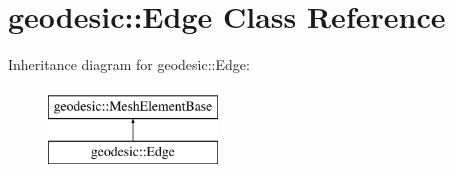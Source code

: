 \hypertarget{classgeodesic_1_1_edge}{}\section{geodesic\+:\+:Edge Class Reference}
\label{classgeodesic_1_1_edge}
Inheritance diagram for geodesic\+:\+:Edge\+:\begin{figure}[H]
\begin{center}
\leavevmode
\includegraphics[height=2.000000cm]{classgeodesic_1_1_edge}
\end{center}
\end{figure}
